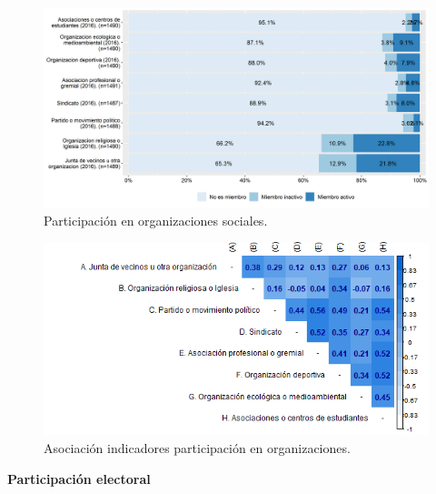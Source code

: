 \documentclass[
  12pt,
]{book}
\begin{document}
\begin{figure}[H]

{\centering \includegraphics[width=1\linewidth,height=1\textheight]{output/graphs/participacion-organizaciones} 

}

\caption{Participación en organizaciones sociales.}\label{fig:participacion-organizaciones}
\end{figure}

\begin{figure}[H]

{\centering \includegraphics[width=1\linewidth,height=1\textheight]{output/graphs/participacion-organizaciones_cor} 

}

\caption{Asociación indicadores participación en organizaciones.}\label{fig:participacion-organizaciones-cor}
\end{figure}

\textbf{Participación electoral}
\end{document}
